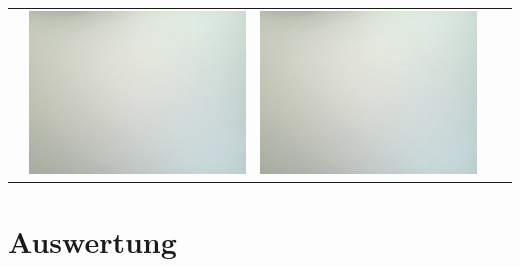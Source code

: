 \begin{tabular}{c c c c c}
 &
\includegraphics[scale=0.11]{media/weissbilder/weissbild_8.png}
 & 
\includegraphics[scale=0.11]{media/weissbilder/weissbild_9.png}
\end{tabular} 

\section{Auswertung}
\label{chap:VERSUCH_3_AUSWERTUNG}

